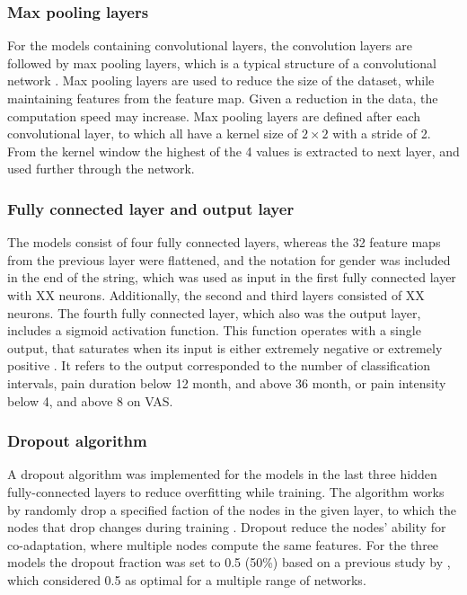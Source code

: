 \subsubsection*{\textbf{Max pooling layers}}
For the models containing convolutional layers, the convolution layers are followed by max pooling layers, which is a typical structure of a convolutional network \citep{LeCun2015, Goodfellow2016}.
Max pooling layers are used to reduce the size of the dataset, while maintaining features from the feature map. Given a reduction in the data, the computation speed may increase.\citep{Goodfellow2016,LeCun1998} 
Max pooling layers are defined after each convolutional layer, to which all have a kernel size of $2 \times 2$ with a stride of 2. From the kernel window the highest of the 4 values is extracted to next layer, and used further through the network. 

\subsubsection{\textbf{Fully connected layer and output layer}}
The models consist of four fully connected layers, whereas the 32 feature maps from the previous layer were flattened, and the notation for gender was included in the end of the string, which was used as input in the first fully connected layer with XX neurons. Additionally, the second and third layers consisted of XX neurons. The fourth fully connected layer, which also was the output layer, includes a sigmoid activation function. 
This function operates with a single output, that saturates when its input is either extremely negative or extremely positive \citep{Goodfellow2016}. It refers to the output corresponded to the number of classification intervals, pain duration below 12 month, and above 36 month, or pain intensity below 4, and above 8 on VAS. 


\subsubsection*{\textbf{Dropout algorithm}}
A dropout algorithm was implemented for the models in the last three hidden fully-connected layers to reduce overfitting while training. The algorithm works by randomly drop a specified faction of the nodes in the given layer, to which the nodes that drop changes during training \citep{Srivastava2014}.  Dropout reduce the nodes’ ability for co-adaptation, where multiple nodes compute the same features. For the three models the dropout fraction was set to 0.5 (50\%) based on a previous study by \citeauthor{Srivastava2014} \citep{Srivastava2014}, which considered 0.5 as optimal for a multiple range of networks.   

